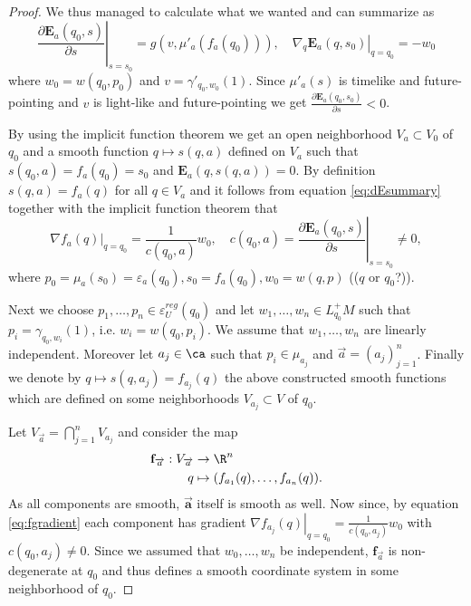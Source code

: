 \begin{proof}
We thus managed to calculate what we wanted and can summarize as
\begin{equation}\label{eq:dEsummary}
    \left.\frac{\partial\mathbf{E}_a(q_0,s)}{\partial s}\right\rvert_{s=s_0} = g(v,\mu'_a(f_a(q_0))), \quad \left.\nabla_q\mathbf{E}_a(q,s_0)\right\rvert_{q=q_0}=-w_0
\end{equation}
where $w_0=w(q_0,p_0)$ and $v=\gamma'_{q_0,w_0}(1)$. Since $\mu'_a(s)$ is timelike and future-pointing and $v$ is light-like and future-pointing we get $\frac{\partial\mathbf{E}_a(q_0,s_0)}{\partial s}<0$.

By using the implicit function theorem we get an open neighborhood $V_a\subset V_0$ of $q_0$ and a smooth function $q\mapsto s(q,a)$ defined on $V_a$ such that $s(q_0,a) = f_a(q_0) = s_0$ and $\mathbf{E}_a(q,s(q,a)) = 0$. By definition $s(q,a)=f_a(q)$ for all $q\in V_a$ and it follows from equation \eqref{eq:dEsummary} together with the implicit function theorem that 
\begin{equation}\label{eq:fgradient}
    \left.\nabla f_a(q)\right\rvert_{q=q_0} = \frac{1}{c(q_0,a)}w_0, \quad 
    c(q_0,a) = \left.\frac{\partial\mathbf{E}_a(q_0,s)}{\partial s}\right\rvert_{s=s_0}\neq 0,
\end{equation}
where $p_0 = \mu_a(s_0)=\varepsilon_a(q_0), s_0 = f_a(q_0), w_0=w(q,p)$ (($q$ or $q_0$?)).

Next we choose $p_1, \dots, p_n \in \varepsilon_U^{reg}(q_0)$ and let $w_1,\dots,w_n\in L^+_{q_0}M$ such that $p_i = \gamma_{q_0,w_i}(1)$, i.e. $w_i=w(q_0,p_i)$. We assume that $w_1,\dots,w_n$ are linearly independent. Moreover let $a_j \in \ca$ such that $p_i\in \mu_{a_j}$ and $\overrightarrow{a}=(a_j)^n_{j=1}$.
Finally we denote by $q\mapsto s(q,a_j)=f_{a_j}(q)$ the above constructed smooth functions which are defined on some neighborhoods $V_{a_j}\subset V$ of $q_0$.

Let $V_{\overrightarrow{a}} = \bigcap_{j=1}^n V_{a_j}$ and consider the map
\begin{align*}
    \mathbf{f}_{\overrightarrow{a}}:V_{\overrightarrow{a}}&\to \R^n\\
    q&\mapsto (f_{a_1}(q),\dots,f_{a_n}(q)).
\end{align*}
As all components are smooth, $\mathbf{\overrightarrow{a}}$ itself is smooth as well. Now since, by equation \eqref{eq:fgradient} each component has gradient $\left.\nabla f_{a_j}(q)\right\rvert_{q=q_0} = \frac{1}{c(q_0,a_j)}w_0$ with $c(q_0,a_j)\neq 0$. Since we assumed that $w_0,\dots,w_n$ be independent, $\mathbf{f}_{\overrightarrow{a}}$ is non-degenerate at $q_0$ and thus defines a smooth coordinate system in some neighborhood of $q_0$.
\end{proof}

